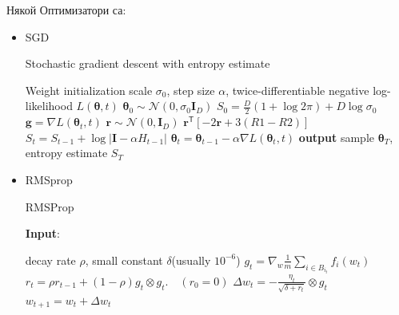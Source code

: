 \documentclass{article}
\newcommand{\stepsize}{\alpha}
\newcommand{\params}{\mathbf{\theta}}
\newcommand{\entropy}{S}
\newcommand{\vI}{\mathbf{I}}
\newcommand{\gradparams}{\nabla L(\params_t, t)}
\newcommand{\N}[2]{\mathcal{N}\!\left(#1,#2\right)}
\newcommand{\vg}{\mathbf{g}}
\newcommand{\vr}{\mathbf{r}}
\newcommand{\tra}{^{\mathsf{T}}}
\begin{document}
    Някой Оптимизатори са:

    \begin{itemize}

        \item SGD

        \begin{algorithm}[H]
            \caption{Stochastic gradient descent with entropy estimate}
            \begin{algorithmic}[1]
                Weight initialization scale $\sigma_0$, step size $\stepsize$,
                twice-differentiable negative log-likelihood $L(\params, t)$
                 $\params_0 \sim \N{0}{\sigma_0 \vI_D}$
                 $\entropy_{0} = \frac{D}{2} (1 + \log 2 \pi) + D \log\sigma_0$
                    \State $\vg = \gradparams$ 
                    \State $\vr \sim \N{0}{\vI_D}$ 
                    \State $\vr\tra \left[ -2 \vr + 3 \left(  R1 - R2 \right) \right]$ 
                    \State $\entropy_{t} = \entropy_{t-1} + \log \left| \vI - \stepsize H_{t-1} \right|$ 
                    \State $\params_{t} = \params_{t-1} - \stepsize \gradparams$ 
                \EndFor
                \State \textbf{output} sample $\params_T$, entropy estimate $\entropy_T$
            \end{algorithmic}
        \end{algorithm}

        \item RMSprop

        \begin{algorithm}[H]
            \caption{RMSProp}
            {\bf Input}:
            \begin{algorithmic}[1]
                 decay rate $\rho$, small constant $\delta$(usually $10^{-6}$)
                    \State $g_t = \nabla_{w} \frac{1}{m} \sum_{i \in B_{i_t}} f_i(w_{t})$ 
                    \State $r_t = \rho r_{t-1} + (1-\rho)g_t \otimes g_t. \quad (r_0 = 0)$ 
                    \State $\Delta w_t = -\frac{\eta_t}{\sqrt{\delta + {r_t}}} \otimes g_t$ 
                    \State $w_{t+1} = w_t + \Delta w_t$ 
                \EndFor
            \end{algorithmic}
        \end{algorithm}


\end{itemize}
\end{document}
